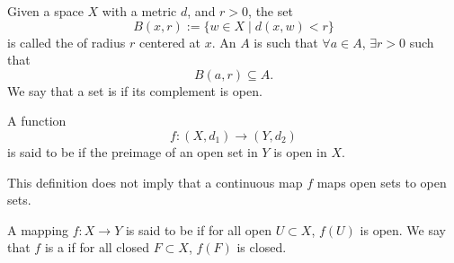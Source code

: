 \documentclass[notoc,notitlepage]{tufte-book}
\begin{document}
\begin{defn}\label{defn:open_and_closed_sets}
  Given a space $X$ with a metric $d$, and $r > 0$, the set
  \begin{equation*}
    B(x, r) := \{ w \in X \mid d(x, w) < r \}
  \end{equation*}
  is called the  of radius $r$ centered at $x$. An  $A$ is such that $\forall a \in A$, $\exists r > 0$ such that
  \begin{equation*}
    B(a, r) \subseteq A.
  \end{equation*}
  We say that a set is  if its complement is open.
\end{defn}

\begin{defn}\label{defn:continuous_map}
  A function
  \begin{equation*}
    f : (X, d_1) \to (Y, d_2)
  \end{equation*}
  is said to be  if the preimage of an open set in $Y$ is open in $X$.
\end{defn}

\begin{warning}
  This definition does not imply that a continuous map $f$ maps open sets to open sets.
\end{warning}

\begin{defn}\label{defn:open_and_closed_maps}
  A mapping $f : X \to Y$ is said to be  if for all open $U \subset X$, $f(U)$ is
  open. We say that $f$ is a  if for all closed $F \subset X$, $f(F)$ is
  closed.
\end{defn}
\end{document}
